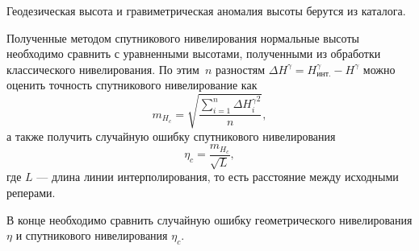 \documentclass[11pt, a4paper,addpoints]{exam}
\theoremstyle{remark}
\begin{document}
\begin{questions}
    Геодезическая высота и гравиметрическая аномалия высоты берутся из каталога.

    Полученные методом спутникового нивелирования нормальные высоты необходимо сравнить с
    уравненными высотами, полученными из обработки классического нивелирования. По этим~$n$ разностям
    $\Delta H^\gamma = H_{\textrm{инт.}}^\gamma - H^\gamma$ можно оценить точность спутникового нивелирование как
    \begin{equation*}
        m_{H_c} = \sqrt{\dfrac{\sum\limits_{i=1}^n{\Delta H^\gamma_i}^2}{n}},
    \end{equation*}
    а также получить случайную ошибку спутникового нивелирования
    \begin{equation*}
        \eta_c = \dfrac{m_{H_c}}{\sqrt{L}},
    \end{equation*}
    где $L$ --- длина линии интерполирования, то есть расстояние между исходными реперами.

    В конце необходимо сравнить случайную ошибку геометрического нивелирования  $\eta$ и
    спутникового нивелирования $\eta_c$.

\end{questions}
\end{document}
